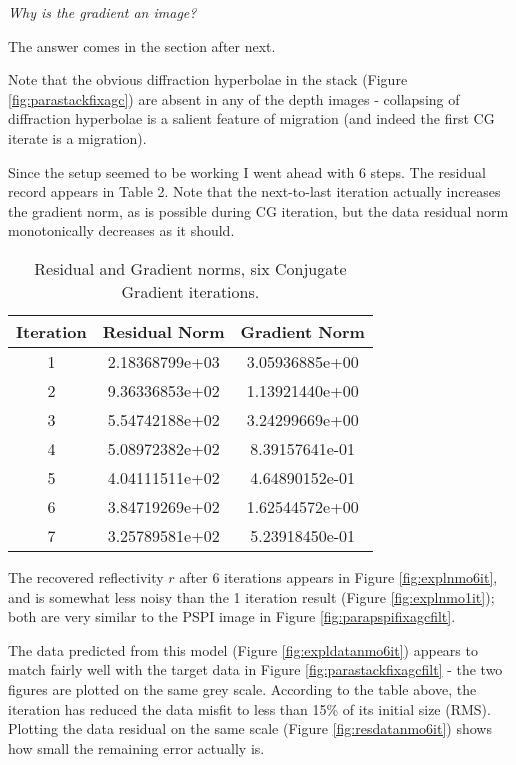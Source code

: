 {\em Why is the gradient an image?}

The answer comes in the section after next. 

Note that the obvious diffraction hyperbolae in the stack (Figure \ref{fig:parastackfixagc}) are absent in any of the depth images - collapsing of diffraction hyperbolae is a salient feature of migration (and indeed the first CG iterate is a migration).

Since the setup seemed to be working I went ahead with 6 steps. The residual record appears in Table %
2.
Note that the next-to-last iteration actually increases the gradient norm, as is possible during CG iteration, but the data residual norm monotonically decreases as it should.
\begin{table}
\label{tab:cg6it}
\begin{center}
\begin{tabular}{|c|c|c|}
\hline
Iteration   &  Residual Norm &  Gradient Norm\\
\hline 
         1  &  2.18368799e+03    & 3.05936885e+00\\
\hline 
         2  &  9.36336853e+02    & 1.13921440e+00\\
\hline 
         3  &  5.54742188e+02  & 3.24299669e+00\\
\hline 
         4  &  5.08972382e+02  & 8.39157641e-01\\
\hline 
         5  &  4.04111511e+02  & 4.64890152e-01\\
\hline 
         6  &  3.84719269e+02  & 1.62544572e+00\\
\hline 
         7  &  3.25789581e+02  & 5.23918450e-01\\
\hline
\end{tabular}
\end{center}
\caption{Residual and Gradient norms, six Conjugate Gradient iterations.}
\end{table}
The recovered reflectivity $r$ after 6 iterations appears in Figure \ref{fig:explnmo6it}, and is somewhat less noisy than the 1 iteration result (Figure \ref{fig:explnmo1it}); both are very similar to the PSPI image in Figure \ref{fig:parapspifixagcfilt}.

The data predicted from this model (Figure \ref{fig:expldatanmo6it}) appears to match fairly well with the target data in Figure \ref{fig:parastackfixagcfilt} - the two figures are plotted on the same grey scale. According to the table above, the iteration has reduced the data misfit to less than 15\% of its initial size (RMS). Plotting the data residual on the same scale (Figure \ref{fig:resdatanmo6it}) shows how small the remaining error actually is.

